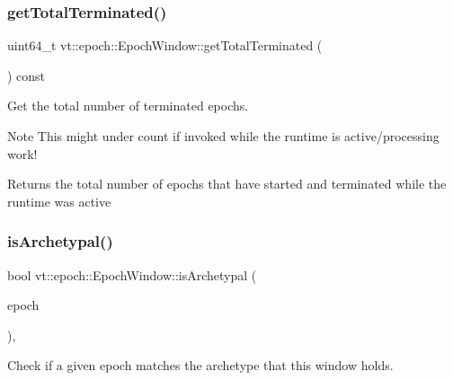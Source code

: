 \subsubsection{\texorpdfstring{get\+Total\+Terminated()}{getTotalTerminated()}}
{\footnotesize\ttfamily uint64\+\_\+t vt\+::epoch\+::\+Epoch\+Window\+::get\+Total\+Terminated (\begin{DoxyParamCaption}{ }\end{DoxyParamCaption}) const\hspace{0.3cm}{\ttfamily [inline]}}



Get the total number of terminated epochs. 

\begin{DoxyNote}{Note}
This might under count if invoked while the runtime is active/processing work!
\end{DoxyNote}
\begin{DoxyReturn}{Returns}
the total number of epochs that have started and terminated while the runtime was active 
\end{DoxyReturn}
\mbox{\label{structvt_1_1epoch_1_1_epoch_window_a9f6b34a8ba87a8a4e6669b3b09958ba2}} 
\subsubsection{\texorpdfstring{is\+Archetypal()}{isArchetypal()}}
{\footnotesize\ttfamily bool vt\+::epoch\+::\+Epoch\+Window\+::is\+Archetypal (\begin{DoxyParamCaption}\item[{\hyperlink{namespacevt_a985a5adf291c34a3ca263b3378388236}{Epoch\+Type}}]{epoch }\end{DoxyParamCaption})\hspace{0.3cm}{\ttfamily [inline]}, {\ttfamily [private]}}



Check if a given epoch matches the archetype that this window holds. 

\mbox{\label{structvt_1_1epoch_1_1_epoch_window_a950c2b957d27d722e9fd311a7639c989}} 
